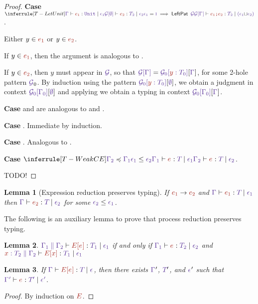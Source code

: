 \documentclass{article}
\newtheorem{lemma}{Lemma}
\begin{document}
\begin{proof}
  \textbf{Case} $\RuleTLetUnit$.

  Either $y \in \E[1]$ or $y \in \E[2]$.

  If $y \in \E[1]$, then the argument is analogous to .

  If $y \in \E[2]$, then $y$ must appear in $\CtxPatternRaw$, so
  that $\CtxPattern{\Ctx} = \CtxPattern[0]{\CtxVar y {\T[0]}}[{\Ctx}]$, for
  some 2-hole pattern $\CtxPatternRaw_0$. By induction using the
  pattern $\CtxPattern[0]{\CtxVar y {\T[0]}}[\CtxEmpty]$, we
  obtain a judgment in context $\CtxPattern[0]{\Ctx[0]}[\CtxEmpty]$
 and applying 
 we obtain a typing in context $\CtxPattern[0]{\Ctx[0]}[{\Ctx}]$.

 \textbf{Case}  and  are analogous
 to  and .

 \textbf{Case} . Immediate by induction.

 \textbf{Case} . Analogous to .

 \textbf{Case} $\RuleTWeakCE$.

 TODO!
\end{proof}

\begin{lemma}[Expression reduction preserves typing]
  If $\E[1] \Reduces \E[2]$ and 
  $\HasType
      {\Ctx}
      {\E[1]}
      {\T}
      {\Eff[1]}$
  then 
  $\HasType
      {\Ctx}
      {\E[2]}
      {\T}
      {\Eff[2]}$
  for some $\Eff[2] \leq \Eff[1]$.
\end{lemma}

The following is an auxiliary lemma to prove that 
process reduction preserves typing.

\begin{lemma}
    $\HasType
      {\CtxExtUnord {\Ctx[1]}{\Ctx[2]}}
      {\EC[\E]}
      {\T[1]}
      {\Eff[1]}$ 
    if and only if
    $\HasType
      {\Ctx[1]}
      {\E}
      {\T[2]}
      {\Eff[2]}$
    and 
    $\HasType
      {\CtxExtUnord {\CtxVar x{\T[2]}}{\Ctx[2]}}
      {\EC[x]}
      {\T[1]}
      {\Eff[1]}$ 
\end{lemma}

\begin{lemma}
  \label{lemma:inversion-evaluation-context}
  If $\HasType{\Ctx}{\EC[\E]}{\T}{\Eff}$, then there exists $\Ctx'$,
  $\T'$, and $\Eff'$ such that $\HasType{\Ctx'}{\E}{\T'}{\Eff'}$.
\end{lemma}
\begin{proof}
  By induction on $\EC$.
\end{proof}
\end{document}
